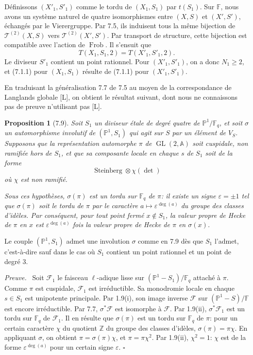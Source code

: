 \documentclass[10pt]{article}
\newcommand{\Fq}{\mathbb F_q}
\newcommand{\Fb}{\mathbb F}
\newcommand{\Z}{\mathbb Z}
\newcommand{\Adele}{\mathbb A}
\newcommand{\GL}{\operatorname{GL}}
\newcommand{\Frob}{\operatorname{Frob}}
\newcommand{\detm}{\operatorname{det}}
\theoremstyle{deligne}
\newtheorem*{proposition*}{Proposition}
\newenvironment{proofdel}[1][Preuve.]{\textit{#1}\ }{\hfill$\square$}
\newcommand{\Stein}{\operatorname{Steinberg}}
\newcommand{\heading}[1]{\vspace{0.7em}\noindent{\bfseries #1}\quad}
\begin{document}
\heading{7.8. Fin de la preuve de 7.1.} Définissons $(X'_1,S'_1)$ comme le tordu de $(X_1,S_1)$ par $t(S_1)$. Sur $\Fb$, nous avons un système naturel de quatre isomorphismes entre $(X,S)$ et $(X',S')$, échangés par le Vierergruppe. Par 7.5, ils induisent tous la même bijection de $\mathcal T^{(2)}(X,S)$ vers $\mathcal T^{(2)}(X',S')$. Par transport de structure, cette bijection est compatible avec l'action de $\Frob$. Il s'ensuit que
\[
T(X_1,S_1,2)=T(X'_1,S'_1,2).
\]
Le diviseur $S'_1$ contient un point rationnel. Pour $(X'_1,S'_1)$, on a donc $N_1\ge2$, et (7.1.1) pour $(X_1,S_1)$ résulte de (7.1.1) pour $(X'_1,S'_1)$.

En traduisant la généralisation 7.7 de 7.5 au moyen de la correspondance de Langlands globale [L], on obtient le résultat suivant, dont nous ne connaissons pas de preuve n'utilisant pas [L].

\begin{proposition*}[7.9]
Soit $S_1$ un diviseur \'{e}tale de degré quatre de $\mathbb P^1/\Fq$, et soit $\sigma$ un automorphisme involutif de $(\mathbb P^1,S_1)$ qui agit sur $S$ par un élément de $V_S$. Supposons que la représentation automorphe $\pi$ de $\GL(2,\Adele)$ soit cuspidale, non ramifiée hors de $S_1$, et que sa composante locale en chaque $s$ de $S_1$ soit de la forme
\[
\Stein\otimes\chi(\detm)
\]
où $\chi$ est non ramifié.

Sous ces hypothèses, $\sigma(\pi)$ est un tordu sur $\Fq$ de $\pi$: il existe un signe $\varepsilon=\pm1$ tel que $\sigma(\pi)$ soit le tordu de $\pi$ par le caractère $a\mapsto\varepsilon^{\operatorname{deg}(a)}$ du groupe des classes d'id\`eles. Par conséquent, pour tout point fermé $x\notin S_1$, la valeur propre de Hecke de $\pi$ en $x$ est $\varepsilon^{\operatorname{deg}(a)}$ fois la valeur propre de Hecke de $\pi$ en $\sigma(x)$.
\end{proposition*}

Le couple $(\mathbb P^1,S_1)$ admet une involution $\sigma$ comme en 7.9 dès que $S_1$ l'admet, c'est-à-dire sauf dans le cas où $S_1$ contient un point rationnel et un point de degré $3$.

\begin{proofdel}
Soit $\mathcal F_1$ le faisceau $\ell$-adique lisse sur $(\mathbb P^1-S_1)/\Fq$ attaché à $\pi$. Comme $\pi$ est cuspidale, $\mathcal F_1$ est irréductible. Sa monodromie locale en chaque $s\in S_1$ est unipotente principale. Par 1.9(i), son image inverse $\mathcal F$ sur $(\mathbb P^1-S)/\Fb$ est encore irréductible. Par 7.7, $\sigma^*\mathcal F$ est isomorphe à $\mathcal F$. Par 1.9(ii), $\sigma^*\mathcal F_1$ est un tordu sur $\Fq$ de $\mathcal F_1$. Il en résulte que $\sigma(\pi)$ est un tordu sur $\Fq$ de $\pi$: pour un certain caractère $\chi$ du quotient $\Z$ du groupe des classes d'id\`eles, $\sigma(\pi)=\pi\chi$. En appliquant $\sigma$, on obtient $\pi=\sigma(\pi)\chi$, et $\pi=\pi\chi^2$. Par 1.9(ii), $\chi^2=1$: $\chi$ est de la forme $\varepsilon^{\operatorname{deg}(a)}$ pour un certain signe $\varepsilon$.
\end{proofdel}
\end{document}
